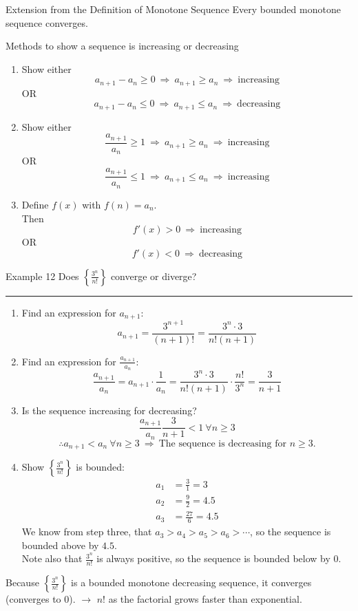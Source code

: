 \documentclass[12pt,a4paper]{article}
\begin{document}
\begin{ext}{Extension from the Definition of Monotone Sequence}
	Every bounded monotone sequence converges. 	
\end{ext}
\begin{thm}{Methods to show a sequence is increasing or decreasing}
	\begin{enumerate}
		\item Show either $$a_{n+1}-a_n\geq 0\ \Rightarrow\ a_{n+1}\geq a_n\ \Rightarrow\ \text{increasing}$$ OR $$a_{n+1}-a_n\leq 0\ \Rightarrow\ a_{n+1}\leq a_n\ \Rightarrow\ \text{decreasing}$$
		\item Show either $$\frac{a_{n+1}}{a_n}\geq1\ \Rightarrow\ a_{n+1}\geq a_n\ \Rightarrow\ \text{increasing}$$ OR $$\frac{a_{n+1}}{a_n}\leq1\ \Rightarrow\ a_{n+1}\leq a_n\ \Rightarrow\ \text{increasing}$$
		\item Define $f(x)$ with $f(n)=a_n$.\\Then $$f'(x)>0\ \Rightarrow\ \text{increasing}$$ OR $$f'(x)<0\ \Rightarrow\ \text{decreasing}$$
	\end{enumerate}	
\end{thm}
\begin{eg}{Example 12}
	Does $\displaystyle\left\{\frac{3^n}{n!}\right\}$ converge or diverge? \\
	\noindent\rule[0.25\baselineskip]{\textwidth}{1pt}
	\begin{enumerate}
		\item Find an expression for $a_{n+1}$: $$a_{n+1}=\frac{3^{n+1}}{(n+1)!}=\frac{3^n\cdot 3}{n!(n+1)}$$
		\item Find an expression for $\displaystyle\frac{a_{n+1}}{a_n}$: $$\frac{a_{n+1}}{a_n}=a_{n+1}\cdot\frac{1}{a_n}=\frac{3^n\cdot 3}{n!(n+1)}\cdot\frac{n!}{3^n}=\frac{3}{n+1}$$
		\item Is the sequence increasing for decreasing? $$\frac{a_{n+1}}{a_n}\frac{3}{n+1}<1\ \forall n\geq 3$$ $$\therefore a_{n+1}<a_n\ \forall n\geq 3\ \Rightarrow\ \text{The sequence is decreasing for }n\geq 3.$$
		\item Show $\displaystyle\left\{\frac{3^n}{n!}\right\}$ is bounded: 
		$$\begin{aligned}a_1&=\frac{3}{1}=3\\a_2&=\frac{9}{2}=4.5\\a_3&=\frac{27}{6}=4.5\end{aligned}$$
		We know from step three, that $a_3>a_4>a_5>a_6>\cdots$, so the sequence is bounded above by $4.5$.\\
		Note also that $\displaystyle\frac{3^n}{n!}$ is always positive, so the sequence is bounded below by 0. 
	\end{enumerate}
	Because $\displaystyle\left\{\frac{3^n}{n!}\right\}$ is a bounded monotone decreasing sequence, it converges (converges to 0). $\longrightarrow$ $n!$ as the factorial grows faster than exponential.
\end{eg}
\end{document}
